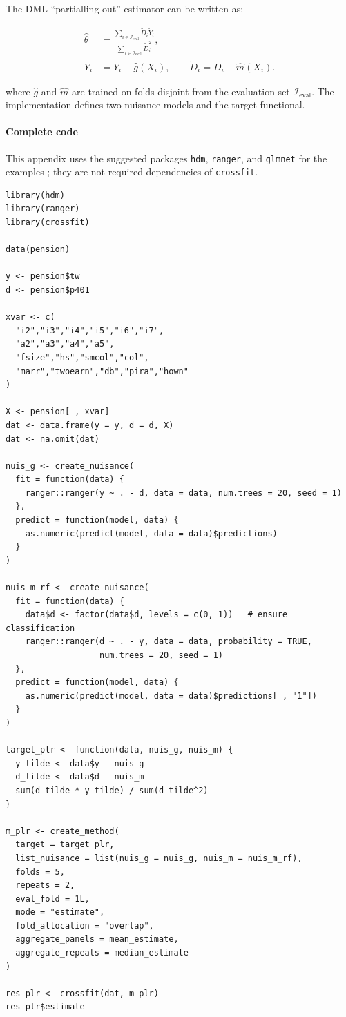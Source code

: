 The DML ``partialling-out'' estimator can be written as:

\begin{equation}
\begin{aligned}
\widehat{\theta}
&=
\frac{\sum_{i \in \mathcal{I}_{\mathrm{eval}}}
\widetilde{D}_i \widetilde{Y}_i}
{\sum_{i \in \mathcal{I}_{\mathrm{eval}}}
\widetilde{D}_i^2},
\\
\widetilde{Y}_i &= Y_i - \widehat{g}(X_i),\qquad
\widetilde{D}_i = D_i - \widehat{m}(X_i).
\end{aligned}
\label{eq:plr-estimator}
\end{equation}

where \(\widehat{g}\) and \(\widehat{m}\) are trained on folds disjoint from the evaluation set \(\mathcal{I}_{\mathrm{eval}}\). The implementation defines two nuisance models and the target functional.

\paragraph{Complete code}\label{complete-code}

This appendix uses the suggested packages \texttt{hdm}, \texttt{ranger}, and \texttt{glmnet} for the examples \citep{hdm, ranger, friedman2010glmnet, tay2023glmnet}; they are not required dependencies of \texttt{crossfit}.

\begin{verbatim}
library(hdm)
library(ranger)
library(crossfit)

data(pension)

y <- pension$tw
d <- pension$p401

xvar <- c(
  "i2","i3","i4","i5","i6","i7",
  "a2","a3","a4","a5",
  "fsize","hs","smcol","col",
  "marr","twoearn","db","pira","hown"
)

X <- pension[ , xvar]
dat <- data.frame(y = y, d = d, X)
dat <- na.omit(dat)

nuis_g <- create_nuisance(
  fit = function(data) {
    ranger::ranger(y ~ . - d, data = data, num.trees = 20, seed = 1)
  },
  predict = function(model, data) {
    as.numeric(predict(model, data = data)$predictions)
  }
)

nuis_m_rf <- create_nuisance(
  fit = function(data) {
    data$d <- factor(data$d, levels = c(0, 1))   # ensure classification
    ranger::ranger(d ~ . - y, data = data, probability = TRUE,
                   num.trees = 20, seed = 1)
  },
  predict = function(model, data) {
    as.numeric(predict(model, data = data)$predictions[ , "1"])
  }
)

target_plr <- function(data, nuis_g, nuis_m) {
  y_tilde <- data$y - nuis_g
  d_tilde <- data$d - nuis_m
  sum(d_tilde * y_tilde) / sum(d_tilde^2)
}

m_plr <- create_method(
  target = target_plr,
  list_nuisance = list(nuis_g = nuis_g, nuis_m = nuis_m_rf),
  folds = 5,
  repeats = 2,
  eval_fold = 1L,
  mode = "estimate",
  fold_allocation = "overlap",
  aggregate_panels = mean_estimate,
  aggregate_repeats = median_estimate
)

res_plr <- crossfit(dat, m_plr)
res_plr$estimate
\end{verbatim}


